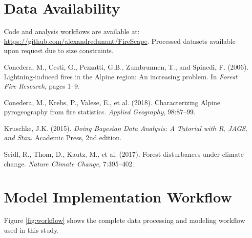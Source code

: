 \documentclass[11pt,a4paper]{article}
\begin{document}
\section*{Data Availability}
Code and analysis workflows are available at: \url{https://github.com/alexandredunant/FireScape}. Processed datasets available upon request due to size constraints.


\begin{thebibliography}{99}

Conedera, M., Cesti, G., Pezzatti, G.B., Zumbrunnen, T., and Spinedi, F. (2006).
\newblock Lightning-induced fires in the Alpine region: An increasing problem.
\newblock In \textit{Forest Fire Research}, pages 1--9.

Conedera, M., Krebs, P., Valese, E., et al. (2018).
\newblock Characterizing Alpine pyrogeography from fire statistics.
\newblock \textit{Applied Geography}, 98:87--99.

Kruschke, J.K. (2015).
\newblock \textit{Doing Bayesian Data Analysis: A Tutorial with R, JAGS, and Stan}.
\newblock Academic Press, 2nd edition.

Seidl, R., Thom, D., Kautz, M., et al. (2017).
\newblock Forest disturbances under climate change.
\newblock \textit{Nature Climate Change}, 7:395--402.

\end{thebibliography}

\appendix

\section{Model Implementation Workflow}

Figure \ref{fig:workflow} shows the complete data processing and modeling workflow used in this study.
\end{document}
